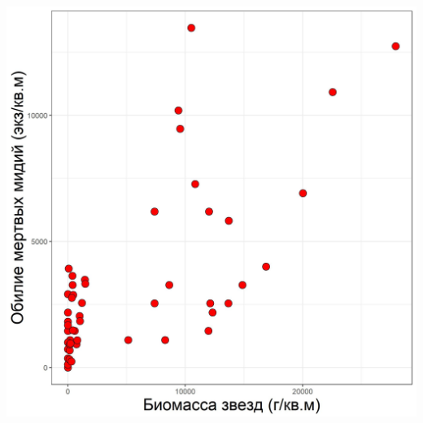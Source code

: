 \documentclass[20pt,a0,portrait]{a0poster}
\begin{document}
\begin{minipage}[t]{0.5\linewidth}
\begin{minipage}[t]{0.46\linewidth}
\begin{center}
			\includegraphics[width=0.9\linewidth]{Baster_N_dead.jpg}
			\label{Baster_Ndead}
		\end{center}\vspace{0.5cm}
\end{minipage}



\end{minipage}
\end{document}
